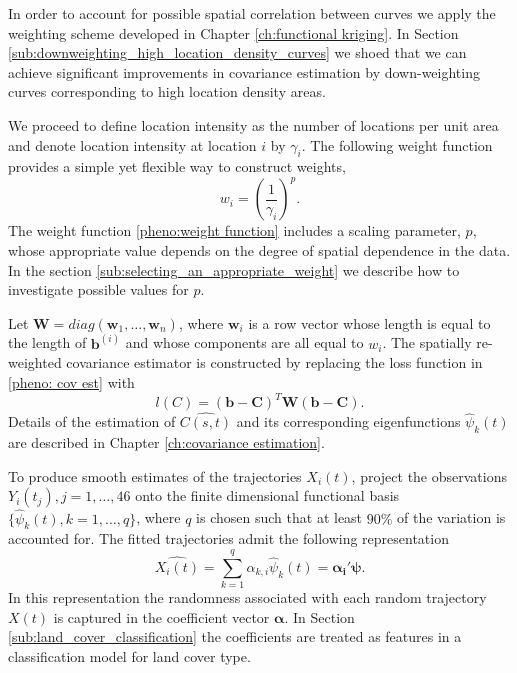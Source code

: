 In order to account for possible spatial correlation between curves we apply the weighting scheme developed in Chapter \ref{ch:functional kriging}. In Section \ref{sub:downweighting_high_location_density_curves} we shoed that we can achieve significant improvements in covariance estimation by down-weighting curves corresponding to high location density areas.

We proceed to define location intensity as the number of locations per unit area and denote location intensity at location $i$ by $\gamma_i$.  The following weight function provides a simple yet flexible way to construct weights,
\begin{equation}
	w_i = \left(\frac{1}{\gamma_i}\right)^p. \label{pheno:weight function}
\end{equation}
The weight function \eqref{pheno:weight function} includes a scaling parameter, $p$, whose appropriate value depends on the degree of spatial dependence in the data. In the section \ref{sub:selecting_an_appropriate_weight} we describe how to investigate possible values for $p$.


Let $\mathbf{W} = diag(\mathbf{w}_1, \dots, \mathbf{w}_n)$, where $\mathbf{w}_i$ is a row vector whose length is equal to the length of $\mathbf{b}^{(i)}$ and whose components are all equal to $w_i$. The spatially re-weighted covariance estimator is constructed by replacing the loss function in \ref{pheno: cov est} with 
\begin{equation}
	l(C)= (\mathbf{b} - \mathbf{C})^T\mathbf{W}(\mathbf{b} - \mathbf{C}). \label{pheno:diag weighted loss function} 
\end{equation}
Details of the estimation of $\widehat{C(s,t)}$ and its corresponding eigenfunctions $\hat{\psi}_k(t)$ are described in Chapter \ref{ch:covariance estimation}. 

To produce smooth estimates of the trajectories $X_i(t)$, project the observations $Y_i(t_j), j = 1, \dots, 46$ onto the finite dimensional functional basis $\{\hat{\psi}_k(t), k = 1, \dots, q\}$, where $q$ is chosen such that at least $90\%$ of the variation is accounted for. The fitted trajectories admit the following representation
\begin{equation}
	\widehat{X_i(t)} = \sum_{k=1}^q\alpha_{k,i} \hat{\psi}_k(t) = \boldsymbol{\alpha_i'}\boldsymbol{\psi}.
	\label{phen:coef}
\end{equation}
In this representation the randomness associated with each random trajectory $X(t)$ is captured in the coefficient vector $\boldsymbol{\alpha}$. In Section \ref{sub:land_cover_classification} the coefficients are treated as features in a classification model for land cover type. 
